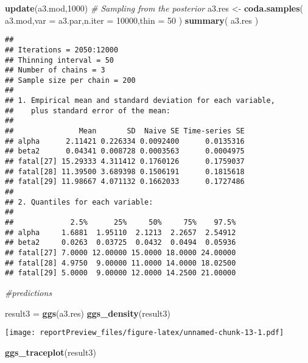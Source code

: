 \documentclass[]{article}
\newenvironment{Shaded}{\begin{snugshade}}{\end{snugshade}}
\newcommand{\KeywordTok}[1]{\textcolor[rgb]{0.13,0.29,0.53}{\textbf{#1}}}
\newcommand{\DataTypeTok}[1]{\textcolor[rgb]{0.13,0.29,0.53}{#1}}
\newcommand{\DecValTok}[1]{\textcolor[rgb]{0.00,0.00,0.81}{#1}}
\newcommand{\StringTok}[1]{\textcolor[rgb]{0.31,0.60,0.02}{#1}}
\newcommand{\CommentTok}[1]{\textcolor[rgb]{0.56,0.35,0.01}{\textit{#1}}}
\newcommand{\NormalTok}[1]{#1}
\begin{document}
\begin{Shaded}
\begin{Highlighting}[]
 \KeywordTok{update}\NormalTok{(a3.mod,}\DecValTok{1000}\NormalTok{)}
 \CommentTok{# Sampling from the posterior}
\NormalTok{ a3.res <-}\StringTok{ }\KeywordTok{coda.samples}\NormalTok{( a3.mod,}\DataTypeTok{var =}\NormalTok{ a3.par,}\DataTypeTok{n.iter =} \DecValTok{10000}\NormalTok{,}\DataTypeTok{thin =} \DecValTok{50}\NormalTok{ )}
 \KeywordTok{summary}\NormalTok{( a3.res )}
\end{Highlighting}
\end{Shaded}

\begin{verbatim}
## 
## Iterations = 2050:12000
## Thinning interval = 50 
## Number of chains = 3 
## Sample size per chain = 200 
## 
## 1. Empirical mean and standard deviation for each variable,
##    plus standard error of the mean:
## 
##               Mean       SD  Naive SE Time-series SE
## alpha      2.11421 0.226334 0.0092400      0.0135316
## beta2      0.04341 0.008728 0.0003563      0.0004975
## fatal[27] 15.29333 4.311412 0.1760126      0.1759037
## fatal[28] 11.39500 3.689398 0.1506191      0.1815618
## fatal[29] 11.98667 4.071132 0.1662033      0.1727486
## 
## 2. Quantiles for each variable:
## 
##             2.5%      25%     50%     75%    97.5%
## alpha     1.6881  1.95110  2.1213  2.2657  2.54912
## beta2     0.0263  0.03725  0.0432  0.0494  0.05936
## fatal[27] 7.0000 12.00000 15.0000 18.0000 24.00000
## fatal[28] 4.9750  9.00000 11.0000 14.0000 18.02500
## fatal[29] 5.0000  9.00000 12.0000 14.2500 21.00000
\end{verbatim}

\begin{Shaded}
\begin{Highlighting}[]
 \CommentTok{#predictions}
\end{Highlighting}
\end{Shaded}

\begin{Shaded}
\begin{Highlighting}[]
\NormalTok{result3 =}\StringTok{ }\KeywordTok{ggs}\NormalTok{(a3.res)}
\KeywordTok{ggs_density}\NormalTok{(result3)}
\end{Highlighting}
\end{Shaded}

\texttt{[image: reportPreview\_files/figure-latex/unnamed-chunk-13-1.pdf]}

\begin{Shaded}
\begin{Highlighting}[]
\KeywordTok{ggs_traceplot}\NormalTok{(result3)}
\end{Highlighting}
\end{Shaded}
\end{document}
